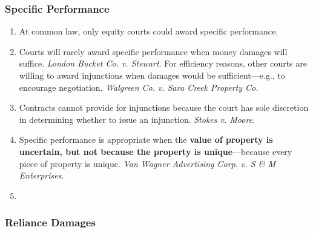 \subsubsection{Specific Performance}

\begin{enumerate}
    \item At common law, only equity courts could award specific performance.
    \item Courts will rarely award specific performance when money damages 
    will suffice. \emph{London Bucket Co. v. Stewart}. For efficiency reasons, 
    other courts are willing to award injunctions when damages would be 
    sufficient---e.g., to encourage negotiation. \emph{Walgreen Co. v. Sara 
    Creek Property Co.}
    \item Contracts cannot provide for injunctions because the court has sole 
    discretion in determining whether to issue an injunction. \emph{Stokes v. 
    Moore}.
    \item Specific performance is appropriate when the \textbf{value of 
    property is uncertain, but not because the property is unique}---because 
    every piece of property is unique.  \emph{Van Wagner Advertising Corp. v. 
    S \& M Enterprises}.
    \item %
\end{enumerate}

\subsubsection{Reliance Damages}

